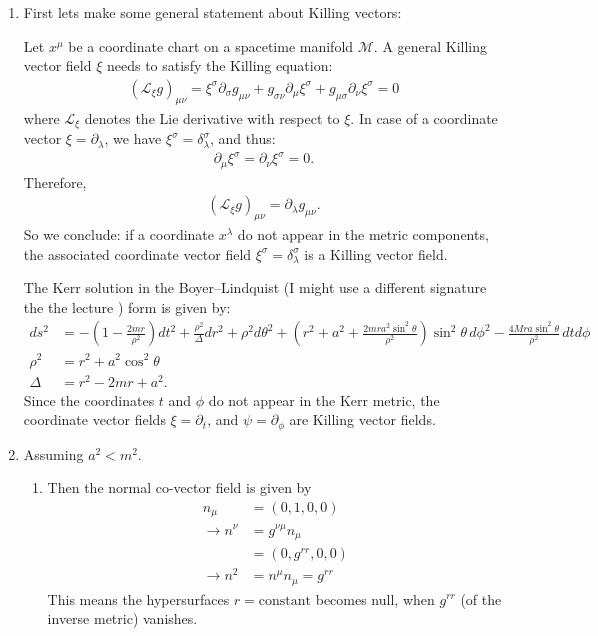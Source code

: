 \documentclass[10pt,a4paper]{article}
\theoremstyle{definition}
\begin{document}
\begin{enumerate}
\item First lets make some general statement about Killing vectors: 

Let $x^\mu$ be a coordinate chart on a spacetime manifold \( \mathcal{M} \). A general Killing vector field $\xi$ needs to satisfy the Killing equation:
\begin{align}
(\mathcal{L}_\xi g)_{\mu\nu} = \xi^\sigma \partial_\sigma g_{\mu\nu} + g_{\sigma\nu} \partial_\mu \xi^\sigma + g_{\mu\sigma} \partial_\nu \xi^\sigma=0
\end{align}
where $\mathcal{L}_\xi$ denotes the Lie derivative with respect to $\xi$. In case of a  coordinate vector $\xi = \partial_\lambda$, we have $\xi^\sigma = \delta^\sigma_\lambda$, and thus:
\begin{align}
\partial_\mu \xi^\sigma = \partial_\nu \xi^\sigma = 0.
\end{align}
Therefore,
\begin{align}
(\mathcal{L}_\xi g)_{\mu\nu} = \partial_\lambda g_{\mu\nu}.
\end{align}
So we conclude: if a coordinate $x^\lambda$ do not appear in the metric components, the associated coordinate vector field $\xi^\sigma = \delta^\sigma_\lambda$ is a Killing vector field.

The Kerr solution in the Boyer–Lindquist (I might use a different signature the the lecture ) form is given by:
\begin{align}
ds^2 &= -\left(1-\frac{2mr}{\rho^2}\right)dt^2+\frac{\rho^2}{\Delta}dr^2+\rho^2d\theta^2+\left(r^2+a^2+\frac{2mra^2\sin^2\theta}{\rho^2}\right)\sin^2\theta\,d\phi^2-\frac{4Mra\sin^2\theta}{\rho^2}\,dtd\phi\\
\rho^2 &= r^2 + a^2 \cos^2\theta\\
\Delta &= r^2 - 2mr + a^2.
\end{align}
Since the coordinates $t$ and $\phi$ do not appear in the Kerr metric, the coordinate vector fields $\xi=\partial_t$, and $\psi=\partial_\phi$ are Killing vector fields.


\item Assuming $a^2<m^2$.
\begin{enumerate}
\item Then the normal co-vector field is given by 
\begin{align}
n_\mu&=(0,1,0,0)\\
\rightarrow n^\nu
&=g^{\nu\mu}n_\mu\\
&=(0,g^{rr},0,0)\\
\rightarrow n^2&=n^\mu n_\mu=g^{rr}
\end{align}
This means the hypersurfaces $r = \text{constant}$ becomes null, 
when $g^{rr}$ (of the inverse metric) vanishes.


\end{enumerate}
\end{enumerate}
\end{document}
